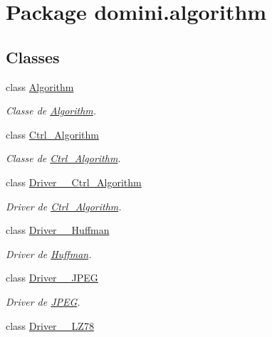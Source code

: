 \hypertarget{namespacedomini_1_1algorithm}{}\section{Package domini.\+algorithm}
\label{namespacedomini_1_1algorithm}
\subsection*{Classes}
\begin{DoxyCompactItemize}
\item 
class \hyperlink{classdomini_1_1algorithm_1_1Algorithm}{Algorithm}
\begin{DoxyCompactList}\small\item\em Classe de \hyperlink{classdomini_1_1algorithm_1_1Algorithm}{Algorithm}. \end{DoxyCompactList}\item 
class \hyperlink{classdomini_1_1algorithm_1_1Ctrl__Algorithm}{Ctrl\+\_\+\+Algorithm}
\begin{DoxyCompactList}\small\item\em Classe de \hyperlink{classdomini_1_1algorithm_1_1Ctrl__Algorithm}{Ctrl\+\_\+\+Algorithm}. \end{DoxyCompactList}\item 
class \hyperlink{classdomini_1_1algorithm_1_1Driver____Ctrl__Algorithm}{Driver\+\_\+\+\_\+\+Ctrl\+\_\+\+Algorithm}
\begin{DoxyCompactList}\small\item\em Driver de \hyperlink{classdomini_1_1algorithm_1_1Ctrl__Algorithm}{Ctrl\+\_\+\+Algorithm}. \end{DoxyCompactList}\item 
class \hyperlink{classdomini_1_1algorithm_1_1Driver____Huffman}{Driver\+\_\+\+\_\+\+Huffman}
\begin{DoxyCompactList}\small\item\em Driver de \hyperlink{classHuffman}{Huffman}. \end{DoxyCompactList}\item 
class \hyperlink{classdomini_1_1algorithm_1_1Driver____JPEG}{Driver\+\_\+\+\_\+\+J\+P\+EG}
\begin{DoxyCompactList}\small\item\em Driver de \hyperlink{classdomini_1_1algorithm_1_1JPEG}{J\+P\+EG}. \end{DoxyCompactList}\item 
class \hyperlink{classdomini_1_1algorithm_1_1Driver____LZ78}{Driver\+\_\+\+\_\+\+L\+Z78}

\end{DoxyCompactItemize}
